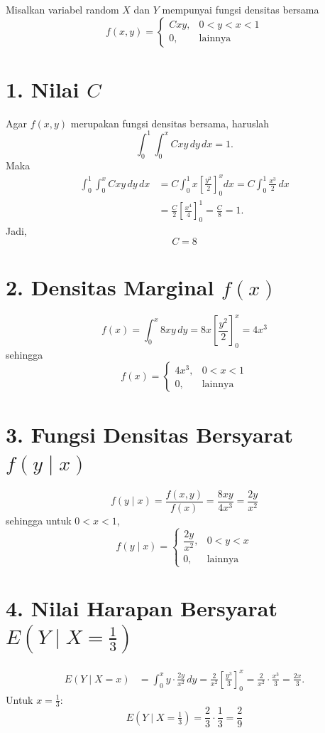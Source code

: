 \documentclass[12pt]{article}
\begin{document}
\noindent Misalkan variabel random $X$ dan $Y$ mempunyai fungsi densitas bersama
\[
f(x,y) =
\begin{cases}
Cxy, & 0 < y < x < 1 \\
0, & \text{lainnya}
\end{cases}
\]

\section*{1. Nilai $C$}
Agar $f(x,y)$ merupakan fungsi densitas bersama, haruslah
\[
\int_{0}^{1}\int_{0}^{x} Cxy \, dy \, dx = 1.
\]
Maka
\begin{align*}
\int_{0}^{1}\int_{0}^{x} Cxy \, dy \, dx
&= C\int_{0}^{1} x \left[\frac{y^2}{2}\right]_{0}^{x} dx
= C\int_{0}^{1} \frac{x^3}{2} \, dx \\
&= \frac{C}{2}\left[\frac{x^4}{4}\right]_{0}^{1}
= \frac{C}{8} = 1.
\end{align*}
Jadi,
\[
\boxed{C = 8}
\]

\section*{2. Densitas Marginal $f(x)$}
\[
f(x) = \int_{0}^{x} 8xy \, dy = 8x\left[\frac{y^2}{2}\right]_{0}^{x} = 4x^3
\]
sehingga
\[
f(x) =
\begin{cases}
4x^3, & 0 < x < 1 \\
0, & \text{lainnya}
\end{cases}
\]

\section*{3. Fungsi Densitas Bersyarat $f(y \mid x)$}
\[
f(y \mid x) = \frac{f(x,y)}{f(x)} = \frac{8xy}{4x^3} = \frac{2y}{x^2}
\]
sehingga untuk $0 < x < 1$,
\[
f(y \mid x) =
\begin{cases}
\dfrac{2y}{x^2}, & 0 < y < x \\[2mm]
0, & \text{lainnya}
\end{cases}
\]

\section*{4. Nilai Harapan Bersyarat $E\left(Y \mid X = \tfrac{1}{3}\right)$}
\begin{align*}
E(Y \mid X = x)
&= \int_{0}^{x} y \cdot \frac{2y}{x^2} \, dy
= \frac{2}{x^2}\left[\frac{y^3}{3}\right]_{0}^{x}
= \frac{2}{x^2}\cdot\frac{x^3}{3}
= \frac{2x}{3}.
\end{align*}
Untuk $x = \tfrac{1}{3}$:
\[
E\left(Y \mid X = \tfrac{1}{3}\right) = \frac{2}{3}\cdot\frac{1}{3} = \boxed{\frac{2}{9}}
\]
\end{document}
